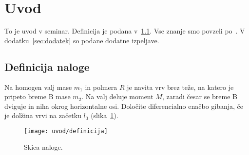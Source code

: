 \section{Uvod}\label{sec:uvod}
To je uvod v seminar. Definicija je podana v~\ref{sec:definicija}. Vse znanje smo povzeli po~\cite{Kuhelj_1998_1}. V dodatku~\ref{sec:dodatek} so podane dodatne izpeljave.

\subsection{Definicija naloge}\label{sec:definicija}
Na homogen valj mase $m_1$ in polmera $R$ je navita vrv brez teže,
na katero je pripeto breme B mase $m_2$. Na valj deluje moment
$M$, zaradi česar se breme B dviguje in niha okrog horizontalne
osi. Določite diferencialno enačbo gibanja, če je dolžina vrvi na
začetku $l_0$ (slika~\ref{fig:definicija}).
%
\begin{figure}[!hb]
\centering
\texttt{[image: uvod/definicija]}
\caption{Skica naloge.}\label{fig:definicija}
\end{figure}

